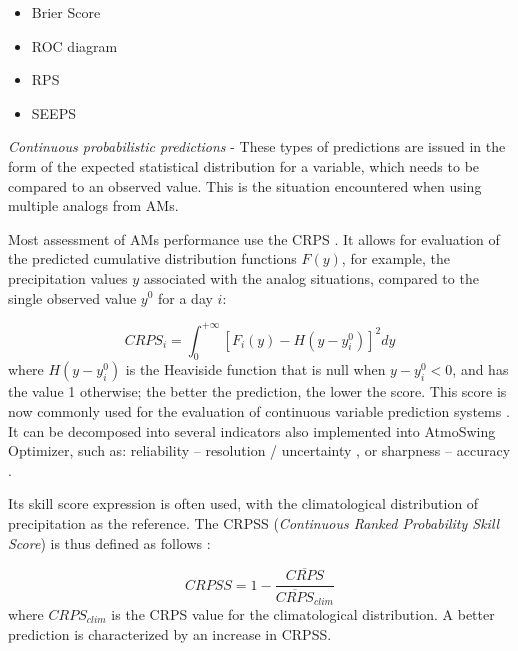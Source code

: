 \documentclass[gmdd]{copernicus}
\begin{document}
\begin{itemize}
	\item Brier Score \citep{Brier1950}
	\item ROC diagram \citep[Relative Operating Characteristic or Receiver Operating Characteristic,][]{Mason1982}
	\item RPS \citep[Ranked Probability Score,][]{Epstein1969}
	\item SEEPS \citep[Stable Equitable Error in Probability Space,][]{Rodwell2010,Rodwell2011}
\end{itemize}


\textit{Continuous probabilistic predictions} - These types of predictions are issued in the form of the expected statistical distribution for a variable, which needs to be compared to an observed value. This is the situation encountered when using multiple analogs from AMs.

Most assessment of AMs performance use the CRPS \citep[Continuous Ranked Probability Score,][]{Brown1974, Matheson1976, Hersbach2000}. It allows for evaluation of the predicted cumulative distribution functions $F(y)$, for example, the precipitation values $y$ associated with the analog situations, compared to the single observed value $y^{0}$ for a day $i$:

\begin{equation}
\label{eq:CRPS}
CRPS_{i} = \int_{0}^{+\infty} \left[ F_{i}(y)-H(y-y_{i}^{0})\right]^{2} dy
\end{equation}
where $H(y-y_{i}^{0})$ is the Heaviside function that is null when $y-y_{i}^{0}<0$, and has the value 1 otherwise; the better the prediction, the lower the score. This score is now commonly used for the evaluation of continuous variable prediction systems \citep{Casati2008, Marty2010}. It can be decomposed into several indicators also implemented into AtmoSwing Optimizer, such as: reliability -- resolution / uncertainty \citep{Hersbach2000}, or sharpness -- accuracy \citep{Bontron2004}.

Its skill score expression is often used, with the climatological distribution of precipitation as the reference. The CRPSS (\textit{Continuous Ranked Probability Skill Score}) is thus defined as follows \citep{Bradley2011}:

\begin{equation}
\label{eq:CRPSS}
CRPSS = 1-\frac{\overline{CRPS}}{\overline{CRPS}_{clim}}
\end{equation}
where $CRPS_{clim}$ is the CRPS value for the climatological distribution. A better prediction is characterized by an increase in CRPSS.
\end{document}
